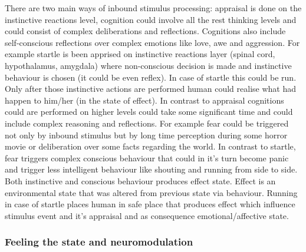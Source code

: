 There are two main ways of inbound stimulus processing: appraisal is done on the instinctive reactions level, cognition could involve all the rest thinking levels and could consist of complex deliberations and reflections.
Cognitions also include self-conscious reflections over complex emotions like love, awe and aggression. For example startle is been apprised on instinctive reactions layer (spinal cord, hypothalamus, amygdala) where non-conscious decision is made and instinctive behaviour is chosen (it could be even reflex). In case of startle this could be run. Only after those instinctive actions are performed human could realise what had happen to him/her (in the state of effect). In contrast to appraisal cognitions could are performed on higher levels could take some significant time and could include complex reasoning and reflections. For example fear could be triggered not only by inbound stimulus but by long time perception during some horror movie or deliberation over some facts regarding the world. In contrast to startle, fear triggers complex conscious behaviour that could in it's turn become panic and trigger less intelligent behaviour like shouting and running from side to side. Both instinctive and conscious behaviour produces effect state. Effect is an environmental state that was altered from previous state via behaviour. Running in case of startle places human in safe place that produces effect which influence stimulus event and it's appraisal and as consequence emotional/affective state.

\subsubsection{Feeling the state and neuromodulation}

